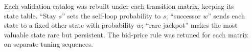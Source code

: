 \documentclass[10pt]{article}
\begin{document}
Each validation catalog was rebuilt under each transition matrix, keeping its state table. ``Stay $s$'' sets the self-loop probability to $s$; ``successor $w$'' sends each state to a fixed other state with probability $w$; ``rare jackpot'' makes the most valuable state rare but persistent. The bid-price rule was retuned for each matrix on separate tuning sequences.

\begin{table}[H]
\centering\small
\caption{Percentage of the online-DP optimum on the validation catalogs under rebuilt transition matrices.}

\end{table}
\end{document}
